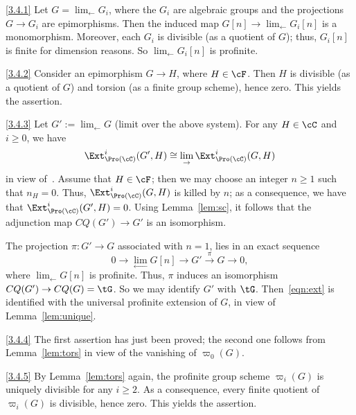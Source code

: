 \begin{proofc}
\begin{step}{\eqref{3.4.1}}%
Let $G = \lim_{\leftarrow} G_i$, where the $G_i$ are algebraic groups and the projections $G \to G_i$ are epimorphisms. Then the induced map $G[n] \to \lim_{\leftarrow} G_i[n]$ is a monomorphism. Moreover, each $G_i$ is divisible (as a quotient of $G$); thus, $G_i[n]$ is finite for dimension reasons. So $\lim_{\leftarrow} G_i[n]$ is profinite.
\end{step}

\begin{step}{\eqref{3.4.2}}%
Consider an epimorphism $G \to H$, where $H \in \cF$. Then $H$ is divisible (as a quotient of $G$) and torsion (as a finite group scheme), hence zero. This yields the assertion.
\end{step}

\begin{step}{\eqref{3.4.3}}%
Let $G' := \lim_{\leftarrow} G$ (limit over the above system). For any $H \in \cC$ and $i \geq 0$, we have
\[
\Ext^i_{\Pro(\cC)}(G',H) \cong
\lim_{\to} \Ext^i_{\Pro(\cC)}(G,H)
\]
in view of~\cite[V.2.3.9]{DG}. Assume that $H \in \cF$; then we may choose an integer $n \geq 1$ such that $n_H = 0$. Thus, $\Ext^i_{\Pro(\cC)}(G,H)$ is killed by $n$; as a consequence, we have that $\Ext^i_{\Pro(\cC)}(G',H) = 0$. Using Lemma~\ref{lem:sc}, it follows that the adjunction map $CQ(G') \to G'$ is an isomorphism.

The projection $\pi : G' \to G$ associated with $n = 1$, lies in an exact sequence
\begin{equation}\label{eqn:ext}
0 \longrightarrow \lim_{\leftarrow} G[n] \longrightarrow G' \stackrel{\pi}{\longrightarrow} G \longrightarrow 0,
\end{equation}
where $\lim_{\leftarrow} G[n]$ is profinite. Thus, $\pi$ induces an isomorphism $CQ(G') \to CQ(G) = \tG$. So we may identify $G'$ with $\tG$. Then~\eqref{eqn:ext} is identified with the universal profinite extension of $G$, in view of Lemma~\ref{lem:unique}.
\end{step}

\begin{step}{\eqref{3.4.4}}%
The first assertion has just been proved; the second one follows from Lemma~\ref{lem:tors} in view of the vanishing of $\varpi_0(G)$.
\end{step}

\begin{laststep}{\eqref{3.4.5}}%
By Lemma~\ref{lem:tors} again, the profinite group scheme $\varpi_i(G)$ is uniquely divisible for any $i \geq 2$. As a consequence, every finite quotient of $\varpi_i(G)$ is divisible, hence zero. This yields the assertion.
\end{laststep}
\let\qed\relax
\end{proofc}

